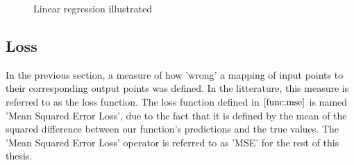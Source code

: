 \begin{figure}
    \centering
    \qquad
    \caption{Linear regression illustrated}%
    \label{fig:linearRegression}%
\end{figure}



\subsection{Loss}
\label{section:loss}

In the previous section, a measure of how 'wrong' a mapping of input points to their corresponding output points was defined.
In the litterature, this measure is referred to as the loss function. 
The loss function defined in $ \eqref{func:mse} $ is named 'Mean Squared Error Loss', 
due to the fact that it is defined by the mean of the squared difference between our function's predictions and the true values.
The 'Mean Squared Error Loss' operator is referred to as 'MSE' for the rest of this thesis.

